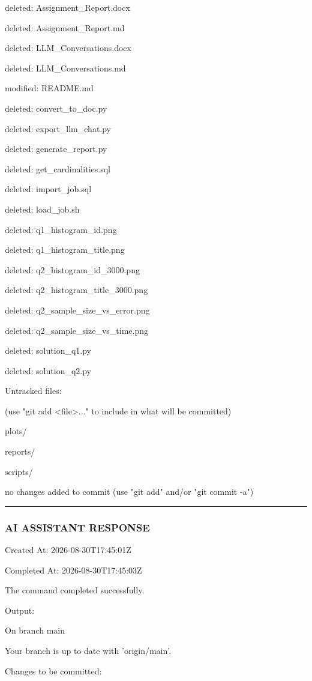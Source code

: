\documentclass[11pt,a4paper]{article}
\begin{document}
{deleted:    Assignment\_Report.docx

deleted:    Assignment\_Report.md

deleted:    LLM\_Conversations.docx

deleted:    LLM\_Conversations.md

modified:   README.md

deleted:    convert\_to\_doc.py

deleted:    export\_llm\_chat.py

deleted:    generate\_report.py

deleted:    get\_cardinalities.sql

deleted:    import\_job.sql

deleted:    load\_job.sh

deleted:    q1\_histogram\_id.png

deleted:    q1\_histogram\_title.png

deleted:    q2\_histogram\_id\_3000.png

deleted:    q2\_histogram\_title\_3000.png

deleted:    q2\_sample\_size\_vs\_error.png

deleted:    q2\_sample\_size\_vs\_time.png

deleted:    solution\_q1.py

deleted:    solution\_q2.py


Untracked files:

(use "git add <file>..." to include in what will be committed)

plots/

reports/

scripts/


no changes added to commit (use "git add" and/or "git commit -a")


\hrule

\subsubsection{AI ASSISTANT RESPONSE}

Created At: 2026-08-30T17:45:01Z

Completed At: 2026-08-30T17:45:03Z


The command completed successfully.

Output:

On branch main

Your branch is up to date with 'origin/main'.


Changes to be committed:

}
\end{document}

